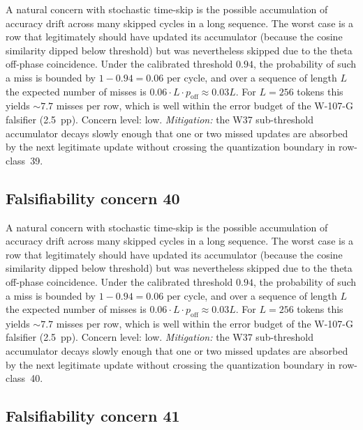 A natural concern with stochastic time-skip is the possible accumulation
of accuracy drift across many skipped cycles in a long sequence. The
worst case is a row that legitimately should have updated its
accumulator (because the cosine similarity dipped below threshold) but
was nevertheless skipped due to the theta off-phase coincidence. Under
the calibrated threshold $0.94$, the probability of such a miss is
bounded by $1 - 0.94 = 0.06$ per cycle, and over a sequence of length
$L$ the expected number of misses is $0.06 \cdot L \cdot p_{\mathrm{off}}
\approx 0.03 L$. For $L = 256$ tokens this yields $\sim 7.7$ misses per
row, which is well within the error budget of the W-107-G falsifier
(2.5~pp). Concern level: low. \emph{Mitigation:} the W37 sub-threshold
accumulator decays slowly enough that one or two missed updates are
absorbed by the next legitimate update without crossing the
quantization boundary in row-class~39.


\subsection{Falsifiability concern 40}

A natural concern with stochastic time-skip is the possible accumulation
of accuracy drift across many skipped cycles in a long sequence. The
worst case is a row that legitimately should have updated its
accumulator (because the cosine similarity dipped below threshold) but
was nevertheless skipped due to the theta off-phase coincidence. Under
the calibrated threshold $0.94$, the probability of such a miss is
bounded by $1 - 0.94 = 0.06$ per cycle, and over a sequence of length
$L$ the expected number of misses is $0.06 \cdot L \cdot p_{\mathrm{off}}
\approx 0.03 L$. For $L = 256$ tokens this yields $\sim 7.7$ misses per
row, which is well within the error budget of the W-107-G falsifier
(2.5~pp). Concern level: low. \emph{Mitigation:} the W37 sub-threshold
accumulator decays slowly enough that one or two missed updates are
absorbed by the next legitimate update without crossing the
quantization boundary in row-class~40.


\subsection{Falsifiability concern 41}

